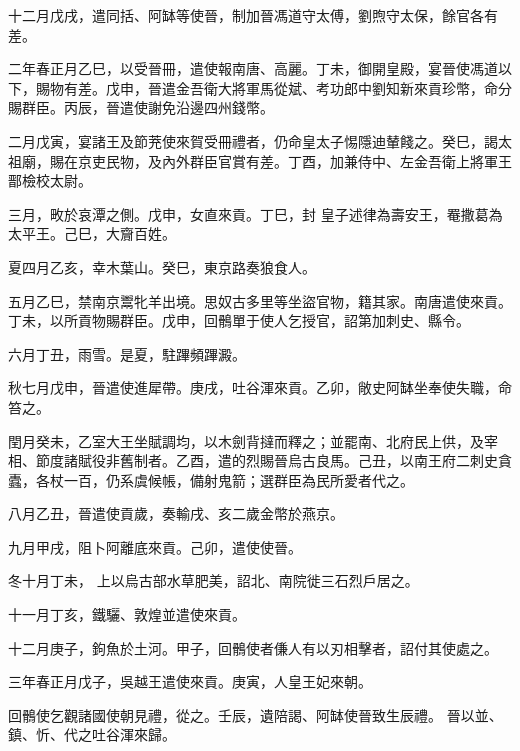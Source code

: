 \begin{pinyinscope}
 十二月戊戌，遣同括、阿缽等使晉，制加晉馮道守太傅，劉煦守太保，餘官各有差。



 二年春正月乙巳，以受晉冊，遣使報南唐、高麗。丁未，御開皇殿，宴晉使馮道以下，賜物有差。戊申，晉遣金吾衛大將軍馬從斌、考功郎中劉知新來貢珍幣，命分賜群臣。丙辰，晉遣使謝免沿邊四州錢幣。



 二月戊寅，宴諸王及節茺使來賀受冊禮者，仍命皇太子惕隱迪輦餞之。癸巳，謁太祖廟，賜在京吏民物，及內外群臣官賞有差。丁酉，加兼侍中、左金吾衛上將軍王鄑檢校太尉。



 三月，畋於哀潭之側。戊申，女直來貢。丁巳，封
 皇子述律為壽安王，罨撒葛為太平王。己巳，大齎百姓。



 夏四月乙亥，幸木葉山。癸巳，東京路奏狼食人。



 五月乙巳，禁南京鬻牝羊出境。思奴古多里等坐盜官物，籍其家。南唐遣使來貢。丁未，以所貢物賜群臣。戊申，回鶻單于使人乞授官，詔第加刺史、縣令。



 六月丁丑，雨雪。是夏，駐蹕頻蹕澱。



 秋七月戊申，晉遣使進犀帶。庚戌，吐谷渾來貢。乙卯，敞史阿缽坐奉使失職，命笞之。



 閏月癸未，乙室大王坐賦調均，以木劍背撻而釋之；並罷南、北府民上供，及宰相、節度諸賦役非舊制者。乙酉，遣的烈賜晉烏古良馬。己丑，以南王府二刺史貪蠹，各杖一百，仍系虞候帳，備射鬼箭；選群臣為民所愛者代之。



 八月乙丑，晉遣使貢歲，奏輸戌、亥二歲金幣於燕京。



 九月甲戌，阻卜阿離底來貢。己卯，遣使使晉。



 冬十月丁未，
 上以烏古部水草肥美，詔北、南院徙三石烈戶居之。



 十一月丁亥，鐵驪、敦煌並遣使來貢。



 十二月庚子，鉤魚於土河。甲子，回鶻使者傔人有以刃相擊者，詔付其使處之。



 三年春正月戊子，吳越王遣使來貢。庚寅，人皇王妃來朝。



 回鶻使乞觀諸國使朝見禮，從之。壬辰，遺陪謁、阿缽使晉致生辰禮。
 晉以並、鎮、忻、代之吐谷渾來歸。




\end{pinyinscope}
